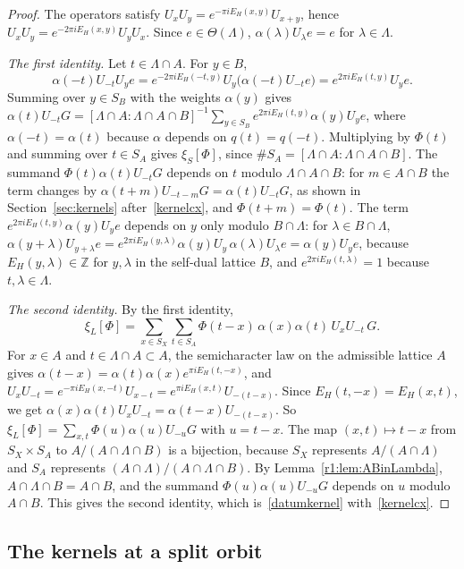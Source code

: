 \begin{proof}
The operators satisfy $U_xU_y=e^{-\pi iE_H(x,y)}U_{x+y}$, hence $U_xU_y=e^{-2\pi iE_H(x,y)}U_yU_x$. Since $e\in\Theta(\Lambda)$, $\alpha(\lambda)U_\lambda e=e$ for $\lambda\in\Lambda$.

\emph{The first identity.} Let $t\in\Lambda\cap A$. For $y\in B$,
\[
\alpha(-t)U_{-t}U_ye=e^{-2\pi iE_H(-t,y)}U_y\big(\alpha(-t)U_{-t}e\big)=e^{2\pi iE_H(t,y)}U_ye .
\]
Summing over $y\in S_B$ with the weights $\alpha(y)$ gives $\alpha(t)U_{-t}G=[\Lambda\cap A:\Lambda\cap A\cap B]^{-1}\sum_{y\in S_B}e^{2\pi iE_H(t,y)}\alpha(y)U_ye$, where $\alpha(-t)=\alpha(t)$ because $\alpha$ depends on $q(t)=q(-t)$. Multiplying by $\Phi(t)$ and summing over $t\in S_A$ gives $\xi_S[\Phi]$, since $\#S_A=[\Lambda\cap A:\Lambda\cap A\cap B]$. The summand $\Phi(t)\alpha(t)U_{-t}G$ depends on $t$ modulo $\Lambda\cap A\cap B$: for $m\in A\cap B$ the term changes by $\alpha(t+m)U_{-t-m}G=\alpha(t)U_{-t}G$, as shown in Section~\ref{sec:kernels} after~\eqref{kernelcx}, and $\Phi(t+m)=\Phi(t)$. The term $e^{2\pi iE_H(t,y)}\alpha(y)U_ye$ depends on $y$ only modulo $B\cap\Lambda$: for $\lambda\in B\cap\Lambda$, $\alpha(y+\lambda)U_{y+\lambda}e=e^{2\pi iE_H(y,\lambda)}\alpha(y)U_y\,\alpha(\lambda)U_\lambda e=\alpha(y)U_ye$, because $E_H(y,\lambda)\in\mathbb Z$ for $y,\lambda$ in the self-dual lattice $B$, and $e^{2\pi iE_H(t,\lambda)}=1$ because $t,\lambda\in\Lambda$.

\emph{The second identity.} By the first identity,
\[
\xi_L[\Phi]=\sum_{x\in S_X}\sum_{t\in S_A}\Phi(t-x)\,\alpha(x)\alpha(t)\,U_xU_{-t}\,G .
\]
For $x\in A$ and $t\in\Lambda\cap A\subset A$, the semicharacter law on the admissible lattice $A$ gives $\alpha(t-x)=\alpha(t)\alpha(x)e^{\pi iE_H(t,-x)}$, and $U_xU_{-t}=e^{-\pi iE_H(x,-t)}U_{x-t}=e^{\pi iE_H(x,t)}U_{-(t-x)}$. Since $E_H(t,-x)=E_H(x,t)$, we get $\alpha(x)\alpha(t)U_xU_{-t}=\alpha(t-x)U_{-(t-x)}$. So $\xi_L[\Phi]=\sum_{x,t}\Phi(u)\alpha(u)U_{-u}G$ with $u=t-x$. The map $(x,t)\mapsto t-x$ from $S_X\times S_A$ to $A/(A\cap\Lambda\cap B)$ is a bijection, because $S_X$ represents $A/(A\cap\Lambda)$ and $S_A$ represents $(A\cap\Lambda)/(A\cap\Lambda\cap B)$. By Lemma~\ref{r1:lem:ABinLambda}, $A\cap\Lambda\cap B=A\cap B$, and the summand $\Phi(u)\alpha(u)U_{-u}G$ depends on $u$ modulo $A\cap B$. This gives the second identity, which is~\eqref{datumkernel} with~\eqref{kernelcx}.
\end{proof}


\subsection{The kernels at a split orbit}\label{r1:sec:R1split}

